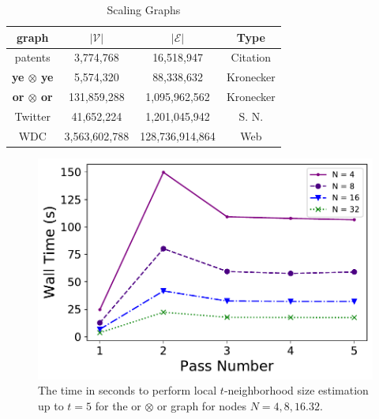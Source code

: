 \documentclass{vldb}
\begin{document}
\begin{table}%
\centering
\caption{Scaling Graphs \label{tab:scaling_graphs}}
\begin{tabular}{|c|c|c|c|}
\hline
\textbf{graph} & $|\mathcal{V}|$ &  $|\mathcal{E}|$ & Type \\
\hline
\hline
patents & 3,774,768 & 16,518,947 & Citation \\
\hline
\textbf{ye $\boldsymbol{\otimes}$ ye} & 5,574,320 & 88,338,632 & Kronecker \\
\hline
\textbf{or $\boldsymbol{\otimes}$ or} & 131,859,288 & 1,095,962,562 & Kronecker \\
\hline
Twitter & 41,652,224 & 1,201,045,942 & S. N. \cite{kunegis2013konect} \\
\hline
WDC & 3,563,602,788 & 128,736,914,864 & Web \\
\hline
\end{tabular}
\end{table}


\begin{figure}[t]
\centering
\includegraphics[width=0.7\columnwidth]{nbhd_scaling}
\caption{The time in seconds to perform local $t$-neighborhood size estimation up to $t=5$ for the or $\otimes$ or graph for nodes $N = 4, 8, 16. 32$. 
}
\label{fig:nbhd_scaling}
\end{figure}
\end{document}
